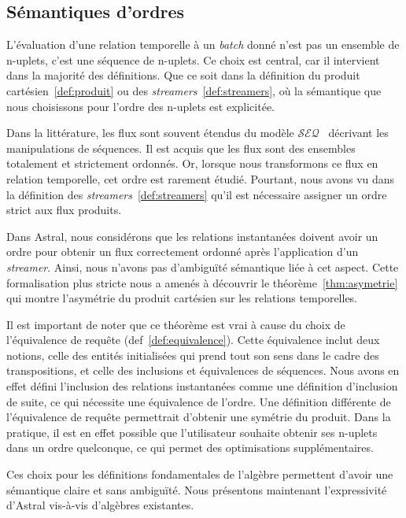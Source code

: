 \subsection{Sémantiques d'ordres}\label{sec:valid:expressivite:modele:ordres}
L'évaluation d'une relation temporelle à un \textit{batch} donné n'est pas un ensemble de n-uplets, c'est une séquence de n-uplets. Ce choix est central, car il intervient dans la majorité des définitions. Que ce soit dans la définition du produit cartésien~\ref{def:produit} ou des \textit{streamers}~\ref{def:streamers}, où la sémantique que nous choisissons pour l'ordre des n-uplets est explicitée.

Dans la littérature, les flux sont souvent étendus du modèle $\mathcal{SEQ}$~\cite{Seshadri:seq} décrivant les manipulations de séquences. Il est acquis que les flux sont des ensembles totalement et strictement ordonnés. Or, lorsque nous transformons ce flux en relation temporelle, cet ordre est rarement étudié. Pourtant, nous avons vu dans la définition des \textit{streamers}~\ref{def:streamers} qu'il est nécessaire assigner un ordre strict aux flux produits. 

Dans Astral, nous considérons que les relations instantanées doivent avoir un ordre pour obtenir un flux correctement ordonné après l'application d'un \textit{streamer}. Ainsi, nous n'avons pas d'ambiguïté sémantique liée à cet aspect. Cette formalisation plus stricte nous a amenés à découvrir le théorème~\ref{thm:asymetrie} qui montre l'asymétrie du produit cartésien sur les relations temporelles.

Il est important de noter que ce théorème est vrai à cause du choix de l'équivalence de requête (def~\ref{def:equivalence}). Cette équivalence inclut deux notions, celle des entités initialisées qui prend tout son sens dans le cadre des transpositions, et celle des inclusions et équivalences de séquences. Nous avons en effet défini l'inclusion des relations instantanées comme une définition d'inclusion de suite, ce qui nécessite une équivalence de l'ordre. Une définition différente de l'équivalence de requête permettrait d'obtenir une symétrie du produit. Dans la pratique, il est en effet possible que l'utilisateur souhaite obtenir ses n-uplets dans un ordre quelconque, ce qui permet des optimisations supplémentaires.

Ces choix pour les définitions fondamentales de l'algèbre permettent d'avoir une sémantique claire et sans ambiguïté. Nous présentons maintenant l'expressivité d'Astral vis-à-vis d'algèbres existantes.
